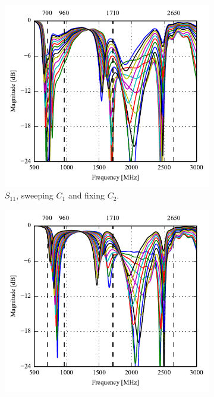 \begin{figure}[htbp]
   \begin{subfigure}[b]{0.49\linewidth}
        \centering
        \includegraphics{img/tech_sol/monopole/s11}
        \caption{$S_{11}$, sweeping $C_1$ and fixing $C_2$.}
    \end{subfigure}
    \hfill
    \begin{subfigure}[b]{0.49\linewidth}
        \centering
        \includegraphics{img/tech_sol/monopole/s22}

\end{subfigure}
\end{figure}
